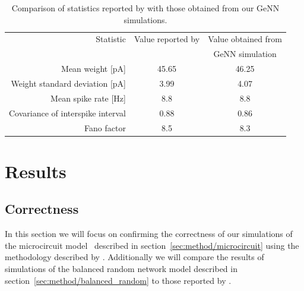 \documentclass[utf8]{frontiersSCNS} %
\begin{document}
\begin{table}
  \centering
  \begin{tabular}{r S S}
    \toprule
        {Statistic}                                     & {Value reported by}       & {Value obtained from} \\
                                                        & {\citet{Morrison2007}}    & {GeNN simulation} \\
    \midrule
        Mean weight [\si{\pico\ampere}]                 & 45.65                     & 46.25 \\
        Weight standard deviation [\si{\pico\ampere}]   & 3.99                      & 4.07 \\
        Mean spike rate [\si{\hertz}]                   & 8.8                       & 8.8 \\
        Covariance of interspike interval               & 0.88                      & 0.86 \\
        Fano factor                                     & 8.5                       & 8.3 \\
    \bottomrule
  \end{tabular}

  \caption{Comparison of statistics reported by \citet{Morrison2007} with those obtained from our GeNN simulations.}
  \label{tab:mad_stats}
\end{table}

\section{Results}
\subsection{Correctness}
\label{sec:results/correctness}
In this section we will focus on confirming the correctness of our simulations of the microcircuit model~\citep{Potjans2012} described in section~\ref{sec:method/microcircuit} using the methodology described by \citet{VanAlbada2018}.
Additionally we will compare the results of simulations of the balanced random network model described in section~\ref{sec:method/balanced_random} to those reported by \citet{Morrison2007}.
\end{document}
